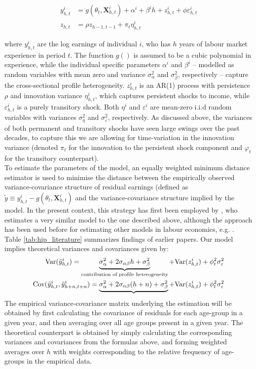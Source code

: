 \begin{align}
y_{h,t}^i &= g(\theta_t, \pmb{X}_{h,t}^i) + \alpha^i + \beta^i h + z_{h,t}^i + \phi \varepsilon_{h,t}^i \label{incproc} \\
z_{h,t} &= \rho z_{h-1,t-1} + \pi_t \eta_{h,t}^i \label{persshock}
\end{align}

where $y_{h,t}^i$ are the log earnings of individual $i$, who has $h$ years of
labour market experience in period $t$. The function $g()$ is assumed to be
a cubic polynomial in experience, while the individual specific parameters
$\alpha^i$ and $\beta^i$ -- modelled as random variables with mean zero and
variance $\sigma^2_{\alpha}$ and $\sigma^2_{\beta}$, respectively --
 capture the cross-sectional profile heterogeneity.
$z_{h,t}^i$ is an AR(1) process with persistence $\rho$ and innovation variance
$\eta_{h,t}^i$, which captures persistent shocks to income, while
$\varepsilon_{h,t}^i$ is a purely transitory shock. Both $\eta^i$ and
$\varepsilon^i$ are mean-zero i.i.d random variables with variances
$\sigma^2_{\eta}$ and $\sigma^2_{\varepsilon}$, respectively. As discussed
above, the variances of both permanent and transitory shocks have seen large
swings over the past decades, to capture this we are allowing for time-variation
in the innovation variance (denoted $\pi_t$ for the innovation to the persistent
shock component and $\varphi_t$ for the transitory counterpart). \\
To estimate the parameters of the model, an equally weighted minimum distance
estimator is used to minimise the distance between the empirically observed
variance-covariance structure of residual earnings (defined as $\tilde{y} \equiv
y_{h,t}^i - g(\theta_t, \pmb{X}_{h,t}^i)$ and the variance-covariance
structure implied by the model. In the present context, this strategy has first
been employed by \citet{Baker1997}, who estimates a very similar model to the one
 described above, although the approach has been used before for estimating
other models in labour economics, e.g. \citet{AbowdCard89}. Table 
\ref{tab:hip_literature} summarizes findings of earlier papers. Our model implies
theoretical variances and covariances given by:
\begin{align}
\mbox{Var}(\tilde{y}_{h,t}^i) = \underbrace{\sigma^2_{\alpha} + 2 \sigma_{\alpha \beta} h + \sigma^2_{\beta}}_{\text{contribution of profile heterogeneity}} + \mbox{Var}(z^i_{h,t}) + \phi_t^2 \sigma^2_{\varepsilon} \\
\mbox{Cov}(\tilde{y}_{h,t}^i, \tilde{y}_{h+n,t+n}^i) = \underbrace{\sigma^2_{\alpha} + 2 \sigma_{\alpha \beta} (h+n) + \sigma^2_{\beta}} + \mbox{Var}(z^i_{h,t}) + \phi_t^2 \sigma^2_{\varepsilon}
\end{align}
The empirical variance-covariance matrix underlying the estimation will be
obtained by first calculating the covariance of residuals for each age-group
in a given year, and then averaging over all age groups present in a given year.
The theoretical counterpart is obtained by simply calculating the corresponding
variances and covariances from the formulas above, and forming weighted averages
over $h$ with weights corresponding to the relative frequency of age-groups in
the empirical data.

